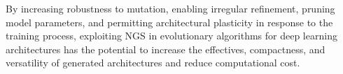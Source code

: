 By increasing robustness to mutation, enabling irregular refinement, pruning model parameters, and permitting architectural plasticity in response to the training process, exploiting NGS in evolutionary algorithms for deep learning architectures has the potential to increase the effectives, compactness, and versatility of generated architectures and reduce computational cost.
